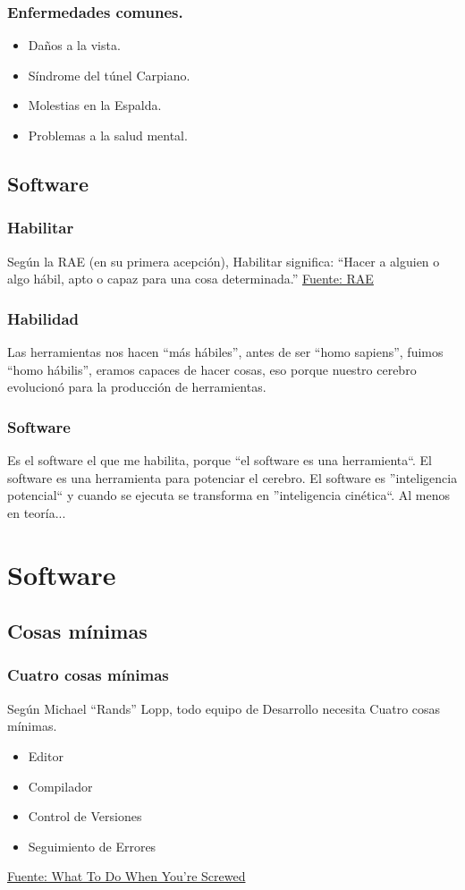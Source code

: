 \documentclass[12pt]{beamer}
\begin{document}
\begin{frame}
 \frametitle{Enfermedades comunes.}
 \begin{itemize}
  \item<2-> Daños a la vista.
  \item<3-> Síndrome del túnel Carpiano.
  \item<4-> Molestias en la Espalda.
  \item<5-> Problemas a la salud mental.
 \end{itemize}
\end{frame}

\subsection{Software}

\begin{frame}
 \frametitle{Habilitar}
 Según la RAE (en su primera acepción), Habilitar significa:
 \newline
 \pause
 ``Hacer a alguien o algo hábil, apto o capaz para una cosa determinada.''
 \href{http://lema.rae.es/drae/?val=habilitar}{Fuente: RAE}
\end{frame}

\begin{frame}
 \frametitle{Habilidad}
 Las herramientas nos hacen ``más hábiles'', antes de ser ``homo sapiens'', fuimos ``homo hábilis'', eramos capaces de hacer cosas, eso porque nuestro cerebro evolucionó para la producción de herramientas.
\end{frame}

\begin{frame}
 \frametitle{Software}
 Es el software el que me habilita, porque ``el software es una \alert{herramienta}``.
 \pause
 El software es una herramienta para potenciar el cerebro. El software es ''inteligencia potencial`` y cuando se ejecuta se transforma en ''inteligencia cinética``. Al menos en teoría...
\end{frame}


\section{Software}
\subsection{Cosas mínimas}

\begin{frame}
 \frametitle{Cuatro cosas mínimas}
 Según Michael ``Rands'' Lopp, todo equipo de Desarrollo necesita Cuatro cosas mínimas.
 \begin{itemize}
  \item<2-> Editor
  \item<3-> Compilador
  \item<4-> Control de Versiones
  \item<5-> Seguimiento de Errores
 \end{itemize}
 \href{http://www.randsinrepose.com/archives/2004/07/10/what_to_do_when_youre_screwed.html}{Fuente: What To Do When You're Screwed}
\end{frame}
\end{document}
